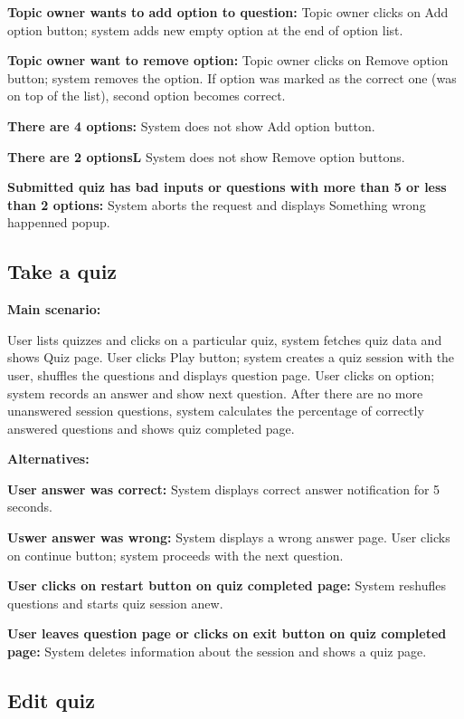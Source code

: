 \documentclass[
    english, %
]{VUMIFPSkursinis}
\begin{document}
\textbf{Topic owner wants to add option to question:} Topic owner clicks on Add option button; system adds new empty option at the end of option list.

\textbf{Topic owner want to remove option:} Topic owner clicks on Remove option button; system removes the option. If option was marked as the correct one (was on top of the list), second option becomes correct.

\textbf{There are 4 options:} System does not show Add option button.

\textbf{There are 2 optionsL} System does not show Remove option buttons.

\textbf{Submitted quiz has bad inputs or questions with more than 5 or less than 2 options:} System aborts the request and displays Something wrong happenned popup.

\subsection{Take a quiz}

\noindent\textbf{\fontsize{13}{15}\selectfont Main scenario:}

User lists quizzes and clicks on a particular quiz, system fetches quiz data and shows Quiz page. User clicks Play button; system creates a quiz session with the user, shuffles the questions and displays question page. User clicks on option; system records an answer and show next question. After there are no more unanswered session questions, system calculates the percentage of correctly answered questions and shows quiz completed page.

\noindent\textbf{\fontsize{13}{15}\selectfont Alternatives:}

\textbf{User answer was correct:} System displays correct answer notification for 5 seconds.

\textbf{Uswer answer was wrong:} System displays a wrong answer page. User clicks on continue button; system proceeds with the next question.

\textbf{User clicks on restart button on quiz completed page:} System reshufles questions and starts quiz session anew.

\textbf{User leaves question page or clicks on exit button on quiz completed page:} System deletes information about the session and shows a quiz page.

\subsection{Edit quiz}
\end{document}
